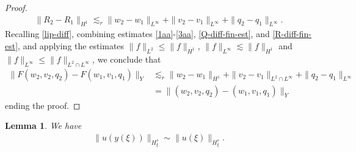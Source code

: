 \documentclass[12pt,reqno]{amsart}
\numberwithin{equation}{section}  %
\numberwithin{figure}{section}
\newtheorem{lemma}[theorem]{Lemma}
\begin{document}
\begin{proof}
\begin{equation}
\begin{split}
  \| R_{2} - R_{1} \|_{H^{1}} \lesssim_{r} \| w_{2} - w_{1} \|_{L^{\infty}} + \| v_{2} - v_{1} \|_{L^{\infty}}
+ \| q_{2} - q_{1} \|_{L^{\infty}}.
\end{split}
\end{equation}
%
%
Recalling \eqref{lip-diff}, combining estimates \eqref{1aa}-\eqref{3aa},
\eqref{Q-diff-fin-est}, and \eqref{R-diff-fin-est}, and applying the estimates
$\| f \|_{L^{2}} \le \| f \|_{H^{1}}$, $\| f \|_{L^{\infty}} \lesssim \| f \|_{H^{1}}$ and $\| f \|_{L^{\infty}} \le \| f
\|_{L^{2} \cap L^{\infty}}$, we conclude that
%
%
%
\begin{equation*}
\begin{split}
    \|F(w_{2}, v_{2}, q_{2}) - F(w_{1}, v_{1}, q_{1})\|_{Y}
    & \lesssim_{r} \| w_{2} - w_{1} \|_{H^{1}} + \| v_{2} - v_{1} \|_{L^{2} \cap L^{\infty}}  + \| q_{2} - q_{1} \|_{L^{\infty}}
    \\
    & = \| (w_{2}, v_{2}, q_{2}) - (w_{1}, v_{1}, q_{1}) \|_{Y}
\end{split}
\end{equation*}
%
%
ending the proof.
%
\end{proof} 
%
%
%
%
%
%
%
%
%
\begin{lemma}
We have
%
%
\begin{equation*}
\begin{split}
  \| u(y(\xi)) \|_{H^{s}_{\xi}} \sim \| u(\xi) \|_{H^{s}_{\xi}}.
\end{split}
\end{equation*}
%
%
%
%
%
%
\label{lem:norm-equiv}
\end{lemma}
%
%
%
%
\end{document}
